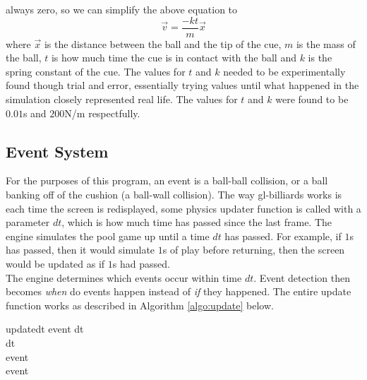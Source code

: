     always zero, so we can simplify the above equation to
    \begin{equation}
        \vec v = \frac{-k t}{m}\vec x
        \label{equ:shot_velocity}
    \end{equation}
    where $\vec x$ is the distance between the ball and the tip of the cue, $m$ is the mass of the ball, $t$ is how much time the
    cue is in contact with the ball and $k$ is the spring constant of the cue. The values for $t$ and $k$ needed to be experimentally
    found though trial and error, essentially trying values until what happened in the simulation closely represented real life. The
    values for $t$ and $k$ were found to be $0.01$s and $200$N/m respectfully.
    
    \subsection{Event System}
    For the purposes of this program, an event is a ball-ball collision, or a ball banking off of the cushion (a ball-wall collision). The
    way gl-billiards works is each time the screen is redisplayed, some physics updater function is called with a parameter $dt$, which
    is how much time has passed since the last frame. The engine simulates the pool game up until a time $dt$ has passed. For example,
    if $1$s has passed, then it would simulate $1$s of play before returning, then the screen would be updated as if $1$s had passed.   \\
    The engine determines which events occur within time $dt$. Event detection then becomes \textit{when} do events happen instead
    of \textit{if} they happened. The entire update function works as described in Algorithm \ref{algo:update} below.   \\
    \begin{center}
    \begin{pseudocode}[framebox]{update}{dt}
        event \gets {} dt     \\
        \IF {}
        \THEN {} dt                                 \\
        \ELSE \BEGIN
             event               \\
             event              \\
        \END
        \label{algo:update}
    \end{pseudocode}
    \end{center}

